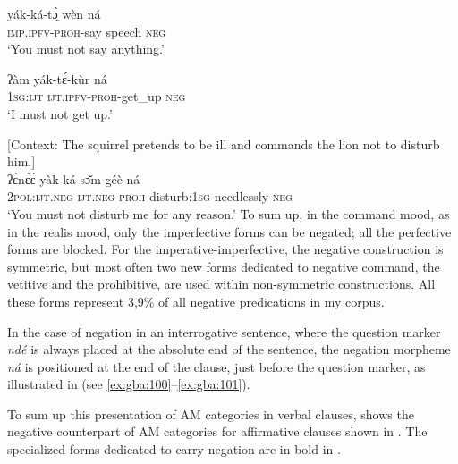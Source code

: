 \documentclass[output=paper,colorlinks=true, citecolor=brown]{langscibook}
\begin{document}
\ea\label{ex:gba:24}
    \gll yák-ká-tɔ̰̀ wèn ná  \\ 
         \textsc{imp.ipfv-proh}-say speech \textsc{neg}  \\
    \glt ‘You must not say anything.’
\z 

\ea\label{ex:gba:25}
    \gll ʔàm yák-tɛ́-kùr ná \\ 
         \textsc{1sg:ijt} \textsc{ijt.ipfv-proh}-get\_up \textsc{neg} \\
    \glt ‘I must not get up.’
\z 

\ea\label{ex:gba:26} [Context: The squirrel pretends to be ill and commands the lion not to disturb him.]\\ 
    \gll ʔɛ̀nɛ̀ɛ́ yàk-ká-sɔ̌m géè ná \\ 
         \textsc{2pol:ijt.neg} \textsc{ijt.neg-proh}-disturb:1\textsc{sg} needlessly \textsc{neg}  \\
    \glt ‘You must not disturb me for any reason.’
\z 
To sum up, in the command mood, as in the realis mood, only the imperfective forms can be negated; all the perfective forms are blocked. For the imperative{}-imperfective, the negative construction is symmetric, but most often two new forms dedicated to negative command, the vetitive and the prohibitive, are used within non-symmetric constructions. All these forms represent 3,9\% of all negative predications in my corpus. 

In the case of negation in an interrogative sentence, where the question marker \textit{ndé} is always placed at the absolute end of the sentence, the negation morpheme \textit{ná} is positioned at the end of the clause, just before the question marker, as illustrated in  (see \ref{ex:gba:100}--\ref{ex:gba:101}).

To sum up this presentation of AM categories in verbal clauses,  shows the negative counterpart of AM categories for affirmative clauses shown in . The specialized forms dedicated to carry negation are in bold in .
\end{document}
